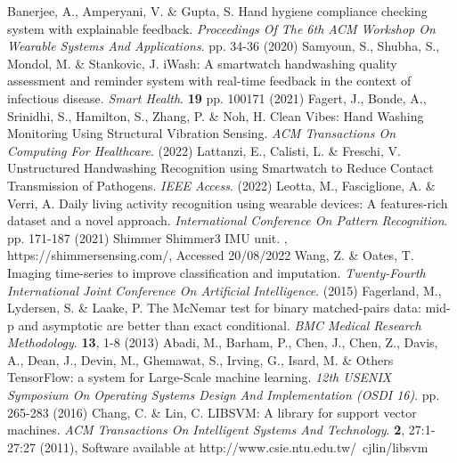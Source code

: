 \begin{thebibliography}{99}
    Banerjee, A., Amperyani, V. \& Gupta, S. Hand hygiene compliance checking system with explainable feedback. {\em Proceedings Of The 6th ACM Workshop On Wearable Systems And Applications}. pp. 34-36 (2020)
    Samyoun, S., Shubha, S., Mondol, M. \& Stankovic, J. iWash: A smartwatch handwashing quality assessment and reminder system with real-time feedback in the context of infectious disease. {\em Smart Health}. \textbf{19} pp. 100171 (2021)
    Fagert, J., Bonde, A., Srinidhi, S., Hamilton, S., Zhang, P. \& Noh, H. Clean Vibes: Hand Washing Monitoring Using Structural Vibration Sensing. {\em ACM Transactions On Computing For Healthcare}. (2022)
    Lattanzi, E., Calisti, L. \& Freschi, V. Unstructured Handwashing Recognition using Smartwatch to Reduce Contact Transmission of Pathogens. {\em IEEE Access}. (2022)
    Leotta, M., Fasciglione, A. \& Verri, A. Daily living activity recognition using wearable devices: A features-rich dataset and a novel approach. {\em International Conference On Pattern Recognition}. pp. 171-187 (2021)
    Shimmer Shimmer3 IMU unit. , https://shimmersensing.com/, Accessed 20/08/2022
    Wang, Z. \& Oates, T. Imaging time-series to improve classification and imputation. {\em Twenty-Fourth International Joint Conference On Artificial Intelligence}. (2015)
    Fagerland, M., Lydersen, S. \& Laake, P. The McNemar test for binary matched-pairs data: mid-p and asymptotic are better than exact conditional. {\em BMC Medical Research Methodology}. \textbf{13}, 1-8 (2013)
    Abadi, M., Barham, P., Chen, J., Chen, Z., Davis, A., Dean, J., Devin, M., Ghemawat, S., Irving, G., Isard, M. \& Others {TensorFlow}: a system for {Large-Scale} machine learning. {\em 12th USENIX Symposium On Operating Systems Design And Implementation (OSDI 16)}. pp. 265-283 (2016)
    Chang, C. \& Lin, C. LIBSVM: A library for support vector machines. {\em ACM Transactions On Intelligent Systems And Technology}. \textbf{2}, 27:1-27:27 (2011), Software available at http://www.csie.ntu.edu.tw/~cjlin/libsvm
\end{thebibliography}